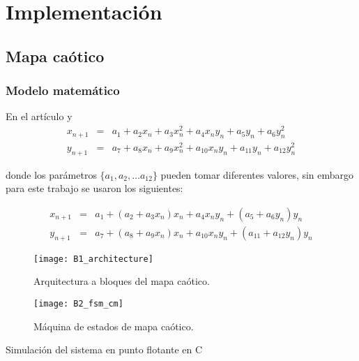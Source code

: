\chapter{Implementación}

	\section{Mapa caótico}
	
	\subsection{Modelo matemático}
	En el artículo \cite{Sprott1993} y \cite{Fraga2021}
	\begin{equation}
	 \begin{array}{ccl}
		x_{n+1} & = &  a_{1} + a_{2}x_{n} + a_{3}x_{n}^{2} + a_{4}x_{n}y_{n} + a_{5}y_{n} + a_{6}y_{n}^{2}\\
		y_{n+1} & = &  a_{7} + a_{8}x_{n} + a_{9}x_{n}^{2} + a_{10}x_{n}y_{n} + a_{11}y_{n} + a_{12}y_{n}^{2}
		\end{array}
	\end{equation}
	
	donde los parámetros $\{a_{1}, a_{2}, \ldots a_{12}\}$ pueden tomar diferentes valores, sin embargo para este trabajo se usaron los siguientes:
	
	
	
	\begin{equation}
	 \begin{array}{ccl}
		x_{n+1} & = &  a_{1} + ( a_{2} + a_{3}x_{n} )x_{n} + a_{4}x_{n}y_{n} + ( a_{5} + a_{6}y_{n} )y_{n} \\
		y_{n+1} & = &  a_{7} + ( a_{8} + a_{9}x_{n} )x_{n} + a_{10}x_{n}y_{n} + ( a_{11} + a_{12}y_{n})y_{n}
		\end{array}
	\end{equation}
	
	
	\begin{figure}[hbtp]
		\caption{Arquitectura a bloques del mapa caótico.}
		\centering
		\texttt{[image: B1\_architecture]}
		\label{fig:B1_architecture}
	\end{figure}
	
	
	\begin{figure}[hbtp]
		\caption{Máquina de estados de mapa caótico.}
		\centering
		\texttt{[image: B2\_fsm\_cm]}
		\label{fig:B2_fsm_cm}
	\end{figure}
	
	
	Simulación del sistema en punto flotante en C
	
